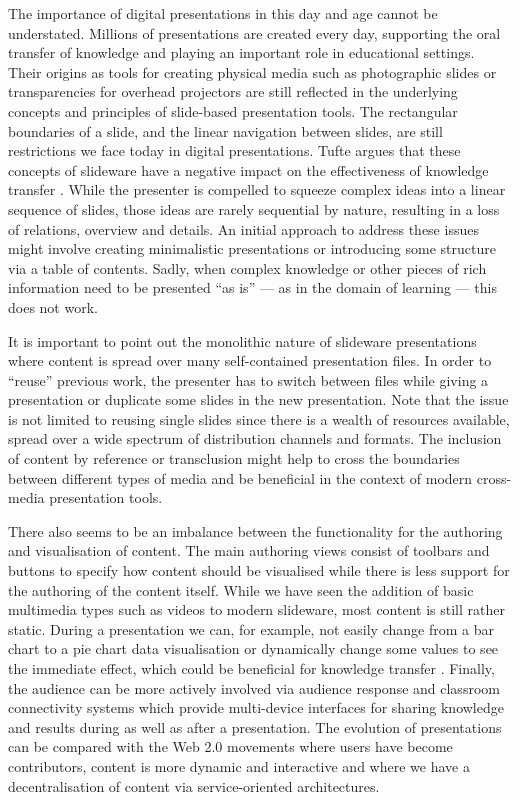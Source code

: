\documentclass[a4paper,12pt]{report}
\begin{document}
    The importance of digital presentations in this day and age cannot be
    understated. Millions of presentations are created every day, supporting
    the oral transfer of knowledge and playing an important role in educational
    settings. Their origins as tools for creating physical media such as
    photographic slides or transparencies for overhead projectors are still
    reflected in the underlying concepts and principles of slide-based
    presentation tools. The rectangular boundaries of a slide, and the linear
    navigation between slides, are still restrictions we face today in digital
    presentations. Tufte argues that these concepts of slideware have a
    negative impact on the effectiveness of knowledge transfer \citep{tufte-1}.
    While the presenter is compelled to squeeze complex ideas into a linear
    sequence of slides, those ideas are rarely sequential by nature, resulting
    in a loss of relations, overview and details. An initial approach to
    address these issues might involve creating minimalistic presentations or
    introducing some structure via a table of contents. Sadly, when complex
    knowledge or other pieces of rich information need to be presented “as is”
    \citep{farkas-1} --- as in the domain of learning --- this does not work.


    It is important to point out the monolithic nature of slideware
    presentations where content is spread over many self-contained presentation
    files. In order to “reuse” previous work, the presenter has to switch
    between files while giving a presentation or duplicate some slides in the
    new presentation. Note that the issue is not limited to reusing single
    slides since there is a wealth of resources available, spread over a wide
    spectrum of distribution channels and formats. The inclusion of content by
    reference or transclusion \citep{nelson-1} might help to cross the
    boundaries between different types of media and be beneficial in the
    context of modern cross-media presentation tools.

    There also seems to be an imbalance between the functionality for the
    authoring and visualisation of content. The main authoring views consist of
    toolbars and buttons to specify how content should be visualised while
    there is less support for the authoring of the content itself. While we
    have seen the addition of basic multimedia types such as videos to modern
    slideware, most content is still rather static. During a presentation we
    can, for example, not easily change from a bar chart to a pie chart data
    visualisation or dynamically change some values to see the immediate
    effect, which could be beneficial for knowledge transfer
    \citep{holzinger-1}. Finally, the audience can be more actively involved
    via audience response and classroom connectivity systems which provide
    multi-device interfaces for sharing knowledge and results during as well as
    after a presentation. The evolution of presentations can be compared with
    the Web 2.0 movements where users have become contributors, content is more
    dynamic and interactive and where we have a decentralisation of content via
    service-oriented architectures.
\end{document}
